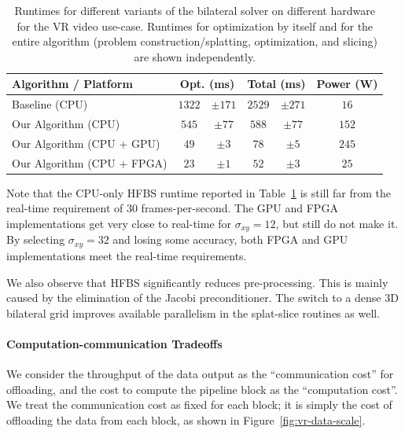 \begin{table}
\centering
\caption{Runtimes for different variants of the bilateral solver on different hardware for the VR video use-case. Runtimes for optimization by itself and for the entire algorithm (problem construction/splatting, optimization, and slicing) are shown independently.}


\begin{tabular}{@{}lc@{}cc@{}cc}
\toprule
Algorithm / Platform & \multicolumn{2}{c}{Opt. (ms) } & \multicolumn{2}{c}{Total (ms)} & Power (W) \\ \midrule
 Baseline (CPU) & $1322$ & $\pm 171$ & $2529$ & $\pm 271$ & $16$ \\
                               Our Algorithm (CPU) & $545$ & $\pm 77$ & $588$ & $\pm 77$ & $152$ \\
                         Our Algorithm (CPU + GPU) & $49$ & $\pm 3$ & $78$ & $\pm 5$ & $245$ \\
                        Our Algorithm (CPU + FPGA) & $23$ & $\pm 1$ & $52$ & $\pm 3$ & $25$ \\
\bottomrule
\end{tabular}

\label{table:jump_runtimes}

\end{table}

Note that the CPU-only HFBS runtime reported in Table~\ref{table:jump_runtimes} is still far from the real-time requirement of 30 frames-per-second. The GPU and FPGA implementations get very close to real-time for $\sigma_{xy} = 12$, but still do not make it.
By selecting $\sigma_{xy} = 32$ and losing some accuracy, both FPGA and GPU implementations meet the real-time requirements.

We also observe that HFBS significantly reduces pre-processing. This is mainly caused by the elimination of the Jacobi preconditioner. The switch to a dense 3D bilateral grid improves available parallelism in the splat-slice routines as well.


\paragraph{Computation-communication Tradeoffs}

We consider the throughput of the data output as the ``communication cost'' for offloading, and the cost to compute the pipeline block as the ``computation cost''. We treat the communication cost as fixed for each block; it is simply the cost of offloading the data from each block, as shown in Figure~\ref{fig:vr-data-scale}.

